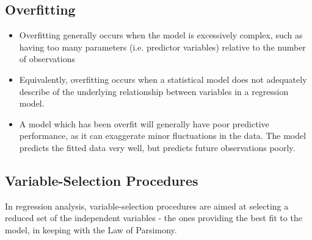 \documentclass[a4paper,12pt]{article}
\begin{document}
\subsection*{Overfitting}
\begin{itemize}
\item Overfitting generally occurs when the model is excessively complex, such as having too many parameters (i.e. predictor variables) relative to the number of observations

\item Equivalently, overfitting occurs when a statistical model does not adequately describe of the underlying relationship between variables in a regression model.

\item A model which has been overfit will generally have poor predictive performance, as it can exaggerate minor fluctuations in the data. The model predicts the fitted data very well, but predicts future observations poorly.

\end{itemize}


\subsection*{Variable-Selection Procedures}

In regression analysis, variable-selection procedures are aimed at selecting a reduced set of the independent variables - the ones providing the best fit to the model, in keeping with the Law of Parsimony.
\end{document}
